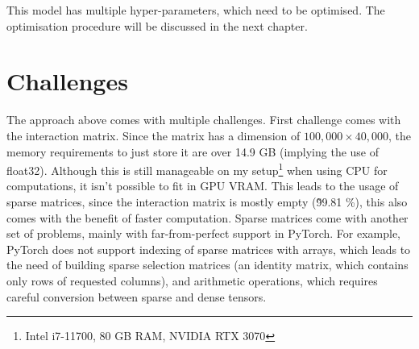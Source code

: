 \documentclass{article}
\begin{document}
This model has multiple hyper-parameters, which need to be optimised. The optimisation procedure will be discussed in the next chapter.

\section{Challenges}

The approach above comes with multiple challenges. First challenge comes with the interaction matrix. Since the matrix has a dimension of $100,000\times40,000$, the memory requirements to just store it are over 14.9 GB (implying the use of float32). Although this is still manageable on my setup\footnote{Intel i7-11700, 80 GB RAM, NVIDIA RTX 3070} when using CPU for computations, it isn't possible to fit in GPU VRAM. This leads to the usage of sparse matrices, since the interaction matrix is mostly empty (\~99.81 \%), this also comes with the benefit of faster computation. Sparse matrices come with another set of problems, mainly with far-from-perfect support in PyTorch\cite{PyTorchSparse}. For example, PyTorch does not support indexing of sparse matrices with arrays, which leads to the need of building sparse selection matrices (an identity matrix, which contains only rows of requested columns), and arithmetic operations, which requires careful conversion between sparse and dense tensors.
\end{document}
